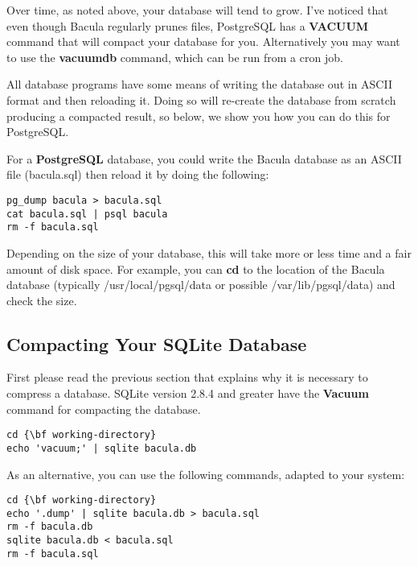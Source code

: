Over time, as noted above, your database will tend to grow. I've noticed that
even though Bacula regularly prunes files, PostgreSQL has a {\bf VACUUM}
command that will compact your database for you. Alternatively you may want to
use the {\bf vacuumdb} command, which can be run from a cron job. 

All database programs have some means of writing the database out in ASCII
format and then reloading it. Doing so will re-create the database from
scratch producing a compacted result, so below, we show you how you can do
this for PostgreSQL. 

For a {\bf PostgreSQL} database, you could write the Bacula database as an
ASCII file (bacula.sql) then reload it by doing the following: 

\footnotesize
\begin{verbatim}
pg_dump bacula > bacula.sql
cat bacula.sql | psql bacula
rm -f bacula.sql
\end{verbatim}
\normalsize

Depending on the size of your database, this will take more or less time and a
fair amount of disk space. For example, you can {\bf cd} to the location of
the Bacula database (typically /usr/local/pgsql/data or possible
/var/lib/pgsql/data) and check the size. 

\subsection*{Compacting Your SQLite Database}

First please read the previous section that explains why it is necessary to
compress a database. SQLite version 2.8.4 and greater have the {\bf Vacuum}
command for compacting the database. 

\footnotesize
\begin{verbatim}
cd {\bf working-directory}
echo 'vacuum;' | sqlite bacula.db
\end{verbatim}
\normalsize

As an alternative, you can use the following commands, adapted to your system:


\footnotesize
\begin{verbatim}
cd {\bf working-directory}
echo '.dump' | sqlite bacula.db > bacula.sql
rm -f bacula.db
sqlite bacula.db < bacula.sql
rm -f bacula.sql
\end{verbatim}
\normalsize

